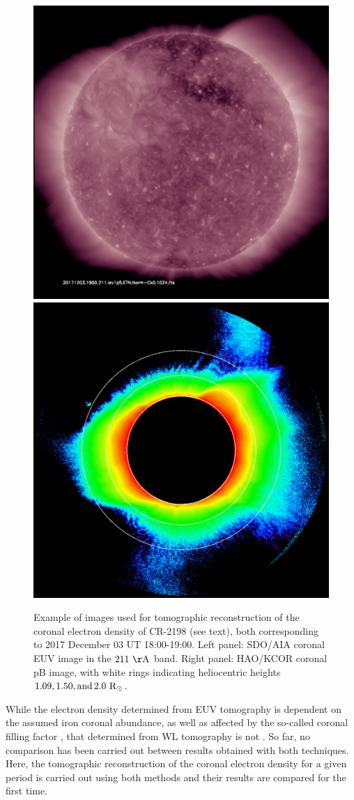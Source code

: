 \documentclass[baaa]{baaa}
\begin{document}
\begin{figure}[ht]
  \centering
  \includegraphics[width=0.67\columnwidth]{img_211.pdf}
  \hskip 1.5cm
  \includegraphics[width=0.67\columnwidth]{20171203_180316_kcor_l1_10min_avg_image.pdf}
  \caption{Example of images used for tomographic reconstruction of the coronal electron density of CR-2198 (see text), both corresponding to 2017 December 03 UT 18:00-19:00. Left panel: SDO/AIA coronal EUV image in the $211~\rm{\AA}$ band. Right panel: HAO/KCOR coronal pB image, with white rings indicating heliocentric heights $1.09, 1.50, \rm{and}\, 2.0~\rm{R}_\odot$.}
  \label{fig_images}
\end{figure}

While the electron density determined from EUV tomography is dependent on the assumed iron coronal abundance, as well as affected by the so-called coronal filling factor \citep{frazin_2009}, that determined from WL tomography is not \citep{frazin_2010}. So far, no {comparison has been carried out} between results obtained with both techniques. Here, the tomographic reconstruction of the coronal electron density for a given period is carried out using both methods and their results are compared for the first time.
\end{document}
